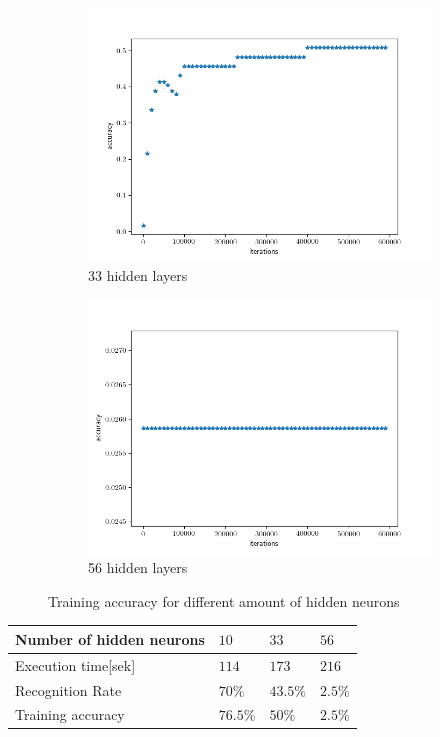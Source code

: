 \begin{figure}[H]
\begin{subfigure}[b]{.45\linewidth}
\includegraphics[width=\linewidth]{img/tests/40ppl/k=27,h=33,60000epoch/res.png}
\caption{33 hidden layers}
\end{subfigure}
\begin{subfigure}[b]{.45\linewidth}
\includegraphics[width=\linewidth]{img/tests/40ppl/k=27,h=56,60000epoch/res.png}
\caption{56 hidden layers}
\end{subfigure}
\caption{Training accuracy for different amount of hidden neurons}
\end{figure}

\begin{center}
    \begin{tabular}{ | l | l | l | p{5cm} |}
    \hline
    Number of hidden neurons &  $10$ & $33$ & $56$ \\ \hline
    Execution time[sek] &  $114$  & $173$ & $216$ \\ \hline
	Recognition Rate & $70\%$ & $43.5\%$ & $2.5\%$ \\ \hline
    Training accuracy & $76.5\%$ & $50\%$ & $2.5\%$\\
    \hline
    \end{tabular}
\end{center}

